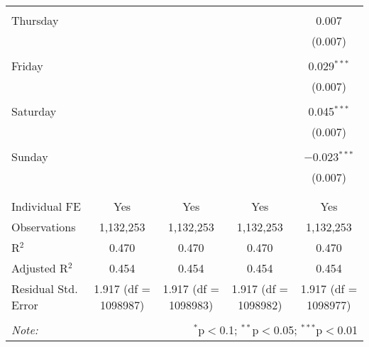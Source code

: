 \documentclass[
]{article}
\begin{document}
\begin{table}[!htbp]
{\begin{tabular}{@{\extracolsep{5pt}}lcccc}
  & & & & \\ 
 Thursday &  &  &  & 0.007 \\ 
  &  &  &  & (0.007) \\ 
  & & & & \\ 
 Friday &  &  &  & 0.029$^{***}$ \\ 
  &  &  &  & (0.007) \\ 
  & & & & \\ 
 Saturday &  &  &  & 0.045$^{***}$ \\ 
  &  &  &  & (0.007) \\ 
  & & & & \\ 
 Sunday &  &  &  & $-$0.023$^{***}$ \\ 
  &  &  &  & (0.007) \\ 
  & & & & \\ 
\hline \\[-1.8ex] 
Individual FE & Yes & Yes & Yes & Yes \\ 
Observations & 1,132,253 & 1,132,253 & 1,132,253 & 1,132,253 \\ 
R$^{2}$ & 0.470 & 0.470 & 0.470 & 0.470 \\ 
Adjusted R$^{2}$ & 0.454 & 0.454 & 0.454 & 0.454 \\ 
Residual Std. Error & 1.917 (df = 1098987) & 1.917 (df = 1098983) & 1.917 (df = 1098982) & 1.917 (df = 1098977) \\ 
\hline 
\hline \\[-1.8ex] 
\textit{Note:}  & \multicolumn{4}{r}{$^{*}$p$<$0.1; $^{**}$p$<$0.05; $^{***}$p$<$0.01} \\ 
\end{tabular}
} 
\end{table} 
\newpage
\end{document}
